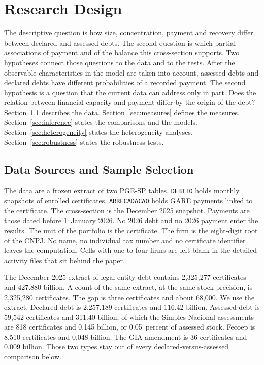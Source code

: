 \section{Research Design}\label{sec:design}\label{sec:data}

The descriptive question is how size, concentration, payment and recovery differ between declared and assessed debts.
The second question is which partial associations of payment and of the balance this cross-section supports.
Two hypotheses connect those questions to the data and to the tests.
After the observable characteristics in the model are taken into account, assessed debts and declared debts have different probabilities of a recorded payment.
The second hypothesis is a question that the current data can address only in part.
Does the relation between financial capacity and payment differ by the origin of the debt?
Section~\ref{sec:sources} describes the data.
Section~\ref{sec:measures} defines the measures.
Section~\ref{sec:inference} states the comparisons and the models.
Section~\ref{sec:heterogeneity} states the heterogeneity analyses.
Section~\ref{sec:robustness} states the robustness tests.

\subsection{Data Sources and Sample Selection}\label{sec:sources}

The data are a frozen extract of two PGE-SP tables.
\texttt{DEBITO} holds monthly snapshots of enrolled certificates.
\texttt{ARRECADACAO} holds GARE payments linked to the certificate.
The cross-section is the December 2025 snapshot.
Payments are those dated before 1~January 2026.
No 2026 debt and no 2026 payment enter the results.
The unit of the portfolio is the certificate.
The firm is the eight-digit root of the CNPJ.
No name, no individual tax number and no certificate identifier leaves the computation.
Cells with one to four firms are left blank in the detailed activity files that sit behind the paper.

The December 2025 extract of legal-entity \vat{} debt contains 2,325,277 certificates and \brl{}427.880 billion.
A count of the same extract, at the same stock precision, is 2,325,280 certificates.
The gap is three certificates and about \brl{}68,000.
We use the extract.
Declared debt is 2,257,189 certificates and \brl{}116.42 billion.
Assessed debt is 59,542 certificates and \brl{}311.40 billion, of which the Simples Nacional assessments are 818 certificates and \brl{}0.145 billion, or 0.05~percent of assessed stock.
Fecoep is 8,510 certificates and \brl{}0.048 billion.
The GIA amendment is 36 certificates and \brl{}0.009 billion.
Those two types stay out of every declared-versus-assessed comparison below.

